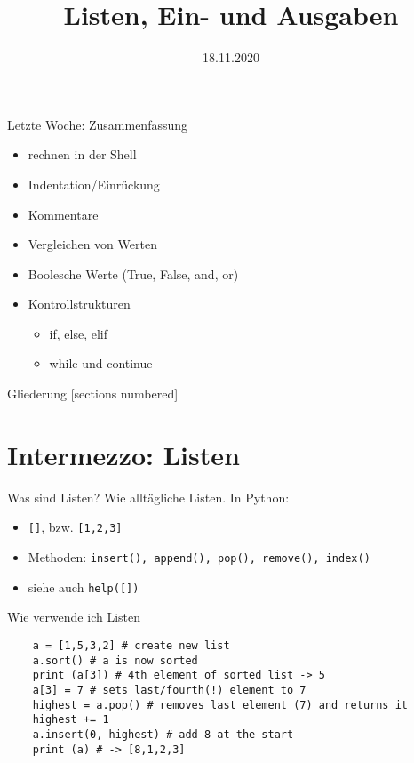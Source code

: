 



\title{Listen, Ein- und Ausgaben}
\date{18.11.2020}


	
\maketitle

\begin{frame}{Letzte Woche: Zusammenfassung}
	\begin{itemize}
		\item rechnen in der Shell
		\item Indentation/Einrückung
		\item Kommentare
		\item Vergleichen von Werten
		\item Boolesche Werte (True, False, and, or)
		\item Kontrollstrukturen
		\begin{itemize}
			\item if, else, elif
			\item while und continue
		\end{itemize}
	\end{itemize}
\end{frame}


\begin{frame}{Gliederung}
    [sections numbered]
    \tableofcontents
\end{frame}

\section{Intermezzo: Listen}

\begin{frame}{Was sind Listen?}
	Wie alltägliche Listen. In Python:
	\begin{itemize}
		\item \texttt{[]}, bzw. \texttt{[1,2,3]}
		\item Methoden: \texttt{insert(), append(), pop(), remove(), index()}
		\item siehe auch \texttt{help([])}
	\end{itemize}
\end{frame}

\begin{frame}[fragile]{Wie verwende ich Listen}
	\begin{lstlisting}
	a = [1,5,3,2] # create new list
	a.sort() # a is now sorted
	print (a[3]) # 4th element of sorted list -> 5
	a[3] = 7 # sets last/fourth(!) element to 7
	highest = a.pop() # removes last element (7) and returns it
	highest += 1
	a.insert(0, highest) # add 8 at the start
	print (a) # -> [8,1,2,3]
	
	\end{lstlisting}
\end{frame}

